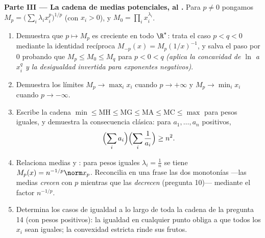 \begin{problem}
\medskip
\noindent\textbf{Parte III --- La cadena de medias potenciales, al
.} Para $p \neq 0$ pongamos $M_p = \bigl(\sum_i\lambda_i
x_i^p\bigr)^{1/p}$ (con $x_i > 0$), y $M_0 = \prod_i
x_i^{\lambda_i}$.
\begin{enumerate}[resume]
  \item Demuestra que $p \mapsto M_p$ es creciente en todo $\R^*$:
        trata el caso $p < q < 0$ mediante la identidad recíproca
        $M_{-p}(x) = M_p(1/x)^{-1}$, y salva el paso por $0$
        probando que $M_p \leq M_0 \leq M_q$ para $p < 0 < q$
        \emph{(aplica la concavidad de $\ln$ a $x_i^q$ y la
        desigualdad invertida para exponentes negativos)}.
  \item Demuestra los límites $M_p \to \max_i x_i$ cuando $p \to
        +\infty$ y $M_p \to \min_i x_i$ cuando $p \to -\infty$.
  \item Escribe la cadena $\min \leq \mathrm{MH} \leq \mathrm{MG}
        \leq \mathrm{MA} \leq \mathrm{MC} \leq \max$ para pesos
        iguales, y demuestra la consecuencia clásica: para $a_1,
        \dots, a_n$ positivos,
        \[
        \Bigl(\sum_i a_i\Bigr)\Bigl(\sum_i\frac1{a_i}\Bigr)
        \geq n^2 .
        \]
  \item Relaciona medias y : para pesos iguales $\lambda_i =
        \frac1n$ se tiene $M_p(x) = n^{-1/p}\norm x_p$. Reconcilia
        en una frase las dos monotonías ---las medias
        \emph{crecen} con $p$ mientras que las 
        \emph{decrecen} (pregunta 10)--- mediante el factor
        $n^{-1/p}$.
  \item Determina los casos de igualdad a lo largo de toda la cadena
        de la pregunta 14 (con pesos positivos): la igualdad en
        cualquier punto obliga a que todos los $x_i$ sean iguales;
        la convexidad estricta rinde sus frutos.
\end{enumerate}


\end{problem}

